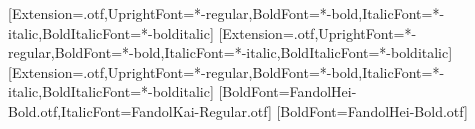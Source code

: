 \setmainfont{texgyreheros}[Extension=.otf,UprightFont=*-regular,BoldFont=*-bold,ItalicFont=*-italic,BoldItalicFont=*-bolditalic]
\setsansfont{texgyreheros}[Extension=.otf,UprightFont=*-regular,BoldFont=*-bold,ItalicFont=*-italic,BoldItalicFont=*-bolditalic]
\setmonofont{texgyrecursor}[Extension=.otf,UprightFont=*-regular,BoldFont=*-bold,ItalicFont=*-italic,BoldItalicFont=*-bolditalic]
[BoldFont=FandolHei-Bold.otf,ItalicFont=FandolKai-Regular.otf]
[BoldFont=FandolHei-Bold.otf]
